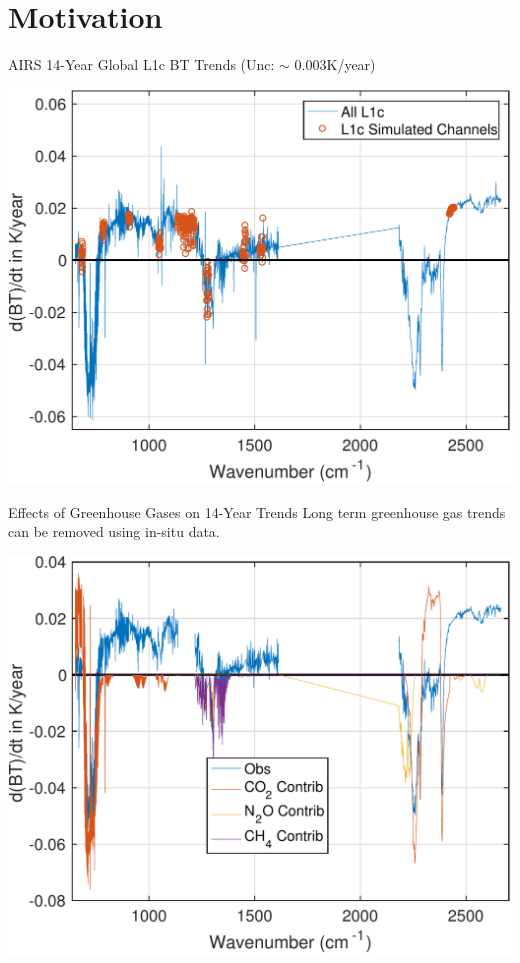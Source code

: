\documentclass[10pt,t]{beamer}
\begin{document}
\section{Motivation}
\label{sec:orgbdcb7cf}

\begin{frame}[label={sec:orgea3a5c0}]{AIRS 14-Year Global L1c BT Trends (Unc: \(\sim\) 0.003K/year)}
\begin{center}
\includegraphics[width=.9\linewidth]{./Figs/Pdf/global_dbt_l1c_allchans_showfake.pdf}
\end{center}
\end{frame}
\begin{frame}[label={sec:org9dc0322}]{Effects of Greenhouse Gases on 14-Year Trends}
\vspace{-0.1in}
Long term greenhouse gas trends can be removed using in-situ data.
\begin{center}
\includegraphics[width=0.8\linewidth]{./Figs/Pdf/global_dbt_l1c_withco2n2och4.pdf}
\end{center}
\end{frame}
\end{document}
